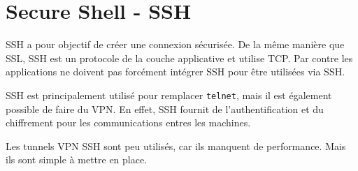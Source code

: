 \section{Secure Shell - SSH}
SSH a pour objectif de créer une connexion sécurisée.
De la même manière que SSL, SSH est un protocole de la couche applicative et utilise TCP.
Par contre les applications ne doivent pas forcément intégrer SSH pour être utilisées via SSH.

SSH est principalement utilisé pour remplacer \texttt{telnet}, mais il est également possible de faire du VPN.
En effet, SSH fournit de l'authentification et du chiffrement pour les communications entres les machines.

Les tunnels VPN SSH sont peu utilisés, car ils manquent de performance.
Mais ils sont simple à mettre en place.